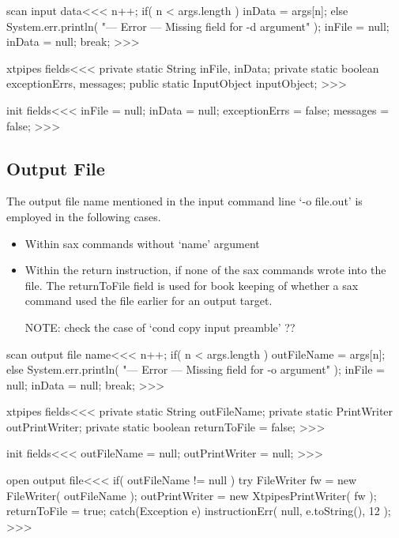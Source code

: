 \documentclass{article}
\begin{document}
{\<scan input data\><<<
n++;
if( n < args.length ){
   inData = args[n];
} else {
   System.err.println(
       "--- Error --- Missing field for -d argument" );
   inFile = null; inData = null; break;
}
>>>






\<xtpipes fields\><<<
private static String     inFile,
                          inData;
private static boolean exceptionErrs, messages;
public static InputObject inputObject;
>>>


\<init fields\><<<
inFile = null;
inData = null;
exceptionErrs = false;
messages = false;
>>>


\subsection{Output File}


The output file name mentioned in the input command line `-o file.out' is
employed in the following cases.

\begin{itemize}
\item
Within sax commands without `name' argument

\item Within the return instruction, if none of the sax commands wrote
  into the file.  The returnToFile field is used for book keeping of
  whether a sax command used the file earlier for an output target.


NOTE: check the case of `cond copy input preamble' ??
\end{itemize}


\<scan output file name\><<<
n++;
if( n < args.length ){
   outFileName = args[n];
} else {
   System.err.println(
       "--- Error --- Missing field for -o argument" );
   inFile = null; inData = null; break;
}
>>>


\<xtpipes fields\><<<
private static String outFileName;
private static PrintWriter outPrintWriter;
private static boolean returnToFile = false;
>>>

\<init fields\><<<
outFileName = null;
outPrintWriter = null;
>>>



\<open output file\><<<
if( outFileName != null ){
   try {
      FileWriter fw = new FileWriter( outFileName );
      outPrintWriter = new XtpipesPrintWriter( fw );
      returnToFile = true;
   } catch(Exception e){
      instructionErr( null, e.toString(), 12 );
}  }
>>>

}
\end{document}
